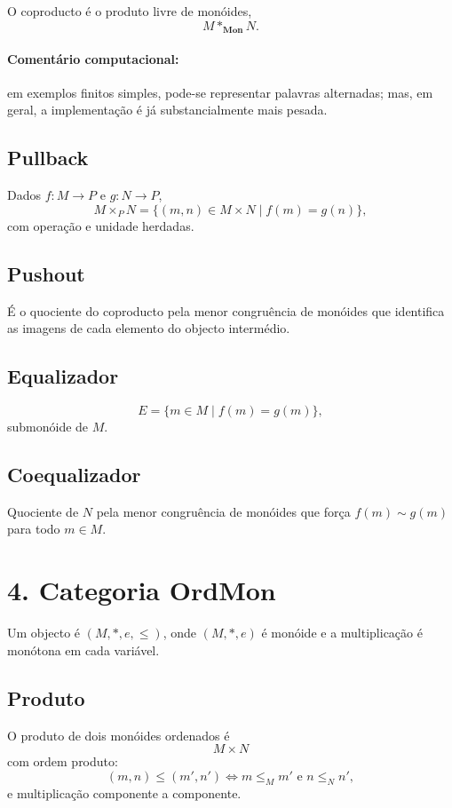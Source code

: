 \documentclass[a4paper,12pt]{article}
\begin{document}
O coproducto é o produto livre de monóides,
\[
M\ast_{\mathbf{Mon}} N.
\]

\paragraph{Comentário computacional:}
em exemplos finitos simples, pode-se representar palavras alternadas; mas, em
geral, a implementação é já substancialmente mais pesada.

\subsection*{Pullback}

Dados $f:M\to P$ e $g:N\to P$,
\[
M\times_P N=\{(m,n)\in M\times N\mid f(m)=g(n)\},
\]
com operação e unidade herdadas.

\subsection*{Pushout}

É o quociente do coproducto pela menor congruência de monóides que identifica
as imagens de cada elemento do objecto intermédio.

\subsection*{Equalizador}

\[
E=\{m\in M\mid f(m)=g(m)\},
\]
submonóide de $M$.

\subsection*{Coequalizador}

Quociente de $N$ pela menor congruência de monóides que força
$f(m)\sim g(m)$ para todo $m\in M$.

\section*{4. Categoria \(\mathbf{OrdMon}\)}

Um objecto é $(M,\ast,e,\le)$, onde $(M,\ast,e)$ é monóide e a multiplicação é
monótona em cada variável.

\subsection*{Produto}

O produto de dois monóides ordenados é
\[
M\times N
\]
com ordem produto:
\[
(m,n)\le(m',n') \iff m\le_M m' \text{ e } n\le_N n',
\]
e multiplicação componente a componente.
\end{document}

